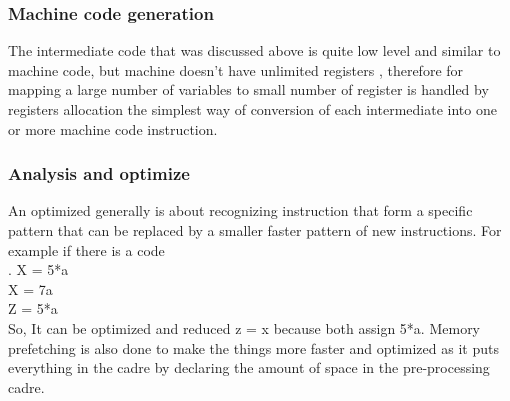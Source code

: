 \documentclass[23pt]{article}
\begin{document}
\subsubsection{Machine code generation}
{\Large The intermediate code that was discussed above is quite low level and similar to machine code, but machine doesn’t have unlimited registers , therefore for mapping a large number of variables to small number of register is handled by registers allocation the simplest way of conversion of each intermediate into one or more machine code instruction. \par}

\subsubsection{Analysis and optimize}
{\Large An optimized generally is about recognizing instruction that form a specific pattern that can be replaced by a smaller faster pattern of new instructions. For example if there is a code \\.
X = 5*a \\
X = 7a \\
Z = 5*a \\
So, It can be optimized and reduced z = x because both assign 5*a. Memory prefetching is also done to make the things more faster and optimized as it puts everything in the cadre by declaring the amount of space in the pre-processing cadre. \par}
\end{document}
